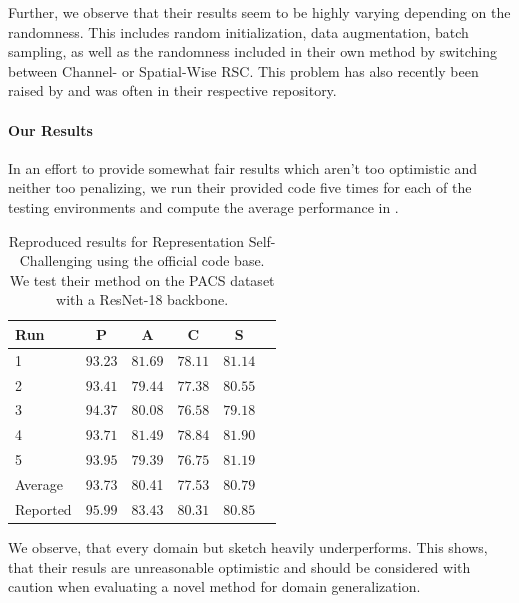 Further, we observe that their results seem to be highly varying depending on the randomness. This includes random initialization, data augmentation, batch sampling, as well as the randomness included in their own method by switching between Channel- or Spatial-Wise RSC. This problem has also recently been raised by \citet{nuriel2020permuted} and was often in their respective repository.

\paragraph{Our Results}
In an effort to provide somewhat fair results which aren't too optimistic and neither too penalizing, we run their provided code five times for each of the testing environments and compute the average performance in . 

\begin{table}[hb]
    \centering
    \begin{tabular}{lccccc}
    \toprule
    \textbf{Run}   &  \textbf{P} & \textbf{A} & \textbf{C} & \textbf{S} \\
    \midrule
    1    & $93.23$  & $81.69$ & $78.11$ & $81.14$ \\
    2    & $93.41$  & $79.44$ & $77.38$ & $80.55$ \\
    3    & $94.37$  & $80.08$ & $76.58$ & $79.18$ \\
    4    & $93.71$  & $81.49$ & $78.84$ & $81.90$ \\
    5    & $93.95$  & $79.39$ & $76.75$ & $81.19$ \\
    \midrule
    Average & 93.73 & 80.41 & 77.53 & $80.79$ \\
    Reported & $95.99$ & $83.43$ & $80.31$ & $80.85$ \\
    \bottomrule
    \end{tabular}
    \caption[Reproduced results for Representation Self-Challenging using the official code base]{Reproduced results for Representation Self-Challenging using the official code base. We test their method on the PACS dataset with a ResNet-18 backbone.} 
    \label{tab:reproduced-RSC}
\end{table}

We observe, that every domain but sketch heavily underperforms. This shows, that their resuls are unreasonable optimistic and should be considered with caution when evaluating a novel method for domain generalization.

